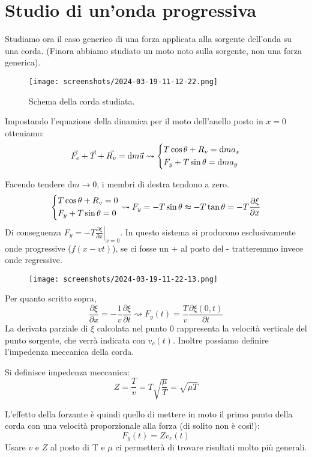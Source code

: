 \section{Studio di un'onda progressiva}

Studiamo ora il caso generico di una forza applicata alla sorgente dell'onda su una corda. (Finora abbiamo studiato un moto noto sulla sorgente, non una forza generica).

\begin{figure}[H]
	\centering
	\texttt{[image: screenshots/2024-03-19-11-12-22.png]}
	\caption{Schema della corda studiata.}
	\label{fig:corda-forzata}
\end{figure}

Impostando l'equazione della dinamica per il moto dell'anello posto in \(x=0\) otteniamo:
\[
	\vec{F_e} + \vec{T} +\vec{R_v}  = \mathrm{d}m \vec{a} \rightsquigarrow \begin{dcases}
		T\cos \theta + R_v = \mathrm{d} m a_x\\
		F_y + T\sin \theta =\mathrm{d} m a_y  \\
	\end{dcases}
\]

Facendo tendere \(\mathrm{d} m \to 0\), i membri di destra tendono a zero.
\[
	\begin{dcases}
		T\cos \theta + R_v = 0\\
		F_y + T\sin \theta = 0  \\
	\end{dcases}
	\rightsquigarrow F_y = -T\sin \theta \thickapprox -T \tan \theta = -T \frac{\partial \xi }{\partial x}
\]
Di conseguenza \(F_y = -T \left. \frac{\partial \xi }{\partial x}\right\vert_{x=0} \). In questo sistema si producono esclusivamente onde progressive (\(f(x-vt)\)), se ci fosse un + al posto del - tratteremmo invece onde regressive.
\begin{figure}[H]
	\centering
	\texttt{[image: screenshots/2024-03-19-11-22-13.png]}
\end{figure}
Per quanto scritto sopra,
\[
	\frac{\partial \xi }{\partial x} = - \frac{1}{v} \frac{\partial \xi }{\partial t} \rightsquigarrow F_y(t) = \frac{T}{v}\frac{\partial \xi (0,t)}{\partial t} 
\]
La derivata parziale di \(\xi \) calcolata nel punto 0 rappresenta la velocità verticale del punto sorgente, che verrà indicata con \(v_c(t)\). Inoltre possiamo definire l'impedenza meccanica della corda.
\begin{definition}
	Si definisce impedenza meccanica:
	\[
		Z=\frac{T}{v}= T \sqrt{\frac{\mu }{T}} = \sqrt{\mu T}  
	\]
\end{definition} 
L'effetto della forzante è quindi quello di mettere in moto il primo punto della corda con una velocità proporzionale alla forza (di solito non è così!):
\[
	F_y(t) = Zv_c(t)
\]
Usare \(v\) e \(Z\) al posto di T e \(\mu \) ci permetterà di trovare risultati molto più generali.


